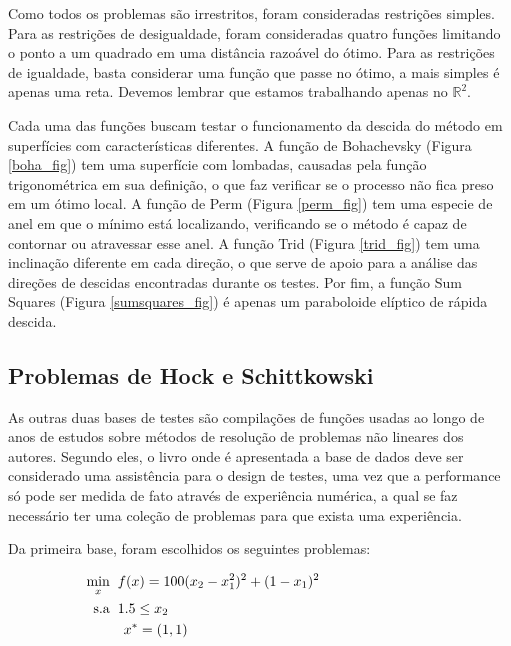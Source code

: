 Como todos os problemas são irrestritos, foram consideradas restrições simples.
Para as restrições de desigualdade, foram consideradas quatro funções limitando o
ponto a um quadrado em uma distância razoável do ótimo. Para as restrições de
igualdade, basta considerar uma função que passe no ótimo, a mais simples é
apenas uma reta. Devemos lembrar que estamos trabalhando apenas no \(\mathbb{R}^2\).

Cada uma das funções buscam testar o funcionamento da descida do método em superfícies
com características diferentes. A função de Bohachevsky (Figura \ref{boha_fig}) tem uma
superfície com lombadas, causadas pela função trigonométrica em sua definição, o que faz
verificar se o processo não fica preso em um ótimo local. A função de Perm (Figura \ref{perm_fig})
tem uma especie de anel em que o mínimo está localizando, verificando se o método é capaz
de contornar ou atravessar esse anel. A função Trid (Figura \ref{trid_fig}) tem uma
inclinação diferente em cada direção, o que serve de apoio para a análise das direções de
descidas encontradas durante os testes. Por fim, a função Sum Squares
(Figura \ref{sumsquares_fig}) é apenas um paraboloide elíptico de rápida descida.



\subsection{Problemas de  Hock e Schittkowski}

\noindent
As outras duas bases de testes são compilações de funções usadas ao longo de anos
de estudos sobre métodos de resolução de problemas não lineares dos autores. Segundo
eles, o livro onde é apresentada a base de dados deve ser considerado uma assistência
para o design de testes, uma vez que a performance só pode ser medida de fato através
de experiência numérica, a qual se faz necessário ter uma coleção de problemas para
que exista uma experiência.

Da primeira base, foram escolhidos os seguintes problemas:


\begin{subequations}
  \label{prob_h1}
  \begin{align}
    \hspace*{0pt}\hfill \underset{x}{\text{min}} \hspace{0.2cm} & f(x) = 100(x_2 - x_1^2)^2 + (1-x_1)^2 \hspace{2.85cm} \\
    \hspace*{0pt}\hfill \text{s.a} \hspace{0.2cm} & 1.5 \leq x_2 \hspace{2.85cm} \\
    \hspace*{0pt}\hfill & \hspace{0.15cm} x^* = (1, 1) \hspace{2.85cm} 
  \end{align}
\end{subequations}

